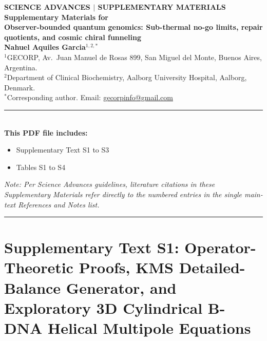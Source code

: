 \documentclass[10pt,letterpaper]{article}
\begin{document}
\thispagestyle{plain}

\begin{center}
{\large\textbf{\color{accentcrimson}SCIENCE ADVANCES $\mid$ SUPPLEMENTARY MATERIALS}}\\[1.0em]
{\Large\textbf{Supplementary Materials for}}\\[0.8em]
{\LARGE\textbf{Observer-bounded quantum genomics: Sub-thermal no-go limits, repair quotients, and cosmic chiral funneling}}\\[1.0em]
{\normalsize\textbf{Nahuel Aquiles Garcia}$^{1,2,*}$}\\[0.5em]
{\small
$^{1}$GECORP, Av.\ Juan Manuel de Rosas 899, San Miguel del Monte, Buenos Aires, Argentina.\\
$^{2}$Department of Clinical Biochemistry, Aalborg University Hospital, Aalborg, Denmark.\\[0.3em]
$^{*}$Corresponding author. Email: \href{mailto:gecorpinfo@gmail.com}{gecorpinfo@gmail.com}
}
\end{center}

\vspace{0.8em}
\noindent\rule{\textwidth}{0.6pt}\\[0.5em]
\noindent\textbf{This PDF file includes:}
\begin{itemize}
    \item Supplementary Text S1 to S3
    \item Tables S1 to S4
\end{itemize}
\noindent\textit{Note: Per Science Advances guidelines, literature citations in these Supplementary Materials refer directly to the numbered entries in the single main-text References and Notes list.}\\[0.3em]
\noindent\rule{\textwidth}{0.6pt}

\vspace{0.8em}
\section*{Supplementary Text S1: Operator-Theoretic Proofs, KMS Detailed-Balance Generator, and Exploratory 3D Cylindrical B-DNA Helical Multipole Equations}
\end{document}
